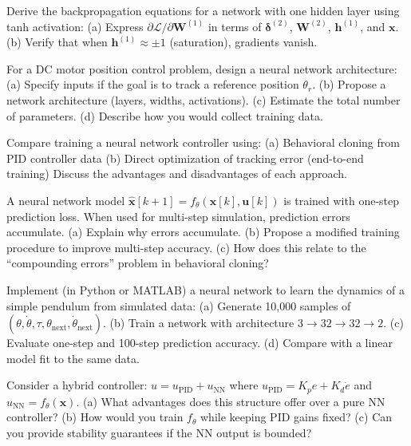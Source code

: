 \begin{exercise}
Derive the backpropagation equations for a network with one hidden layer using tanh activation:
(a) Express $\partial \mathcal{L}/\partial \mathbf{W}^{(1)}$ in terms of $\boldsymbol{\delta}^{(2)}$, $\mathbf{W}^{(2)}$, $\mathbf{h}^{(1)}$, and $\mathbf{x}$.
(b) Verify that when $\mathbf{h}^{(1)} \approx \pm 1$ (saturation), gradients vanish.
\end{exercise}

\begin{exercise}
For a DC motor position control problem, design a neural network architecture:
(a) Specify inputs if the goal is to track a reference position $\theta_r$.
(b) Propose a network architecture (layers, widths, activations).
(c) Estimate the total number of parameters.
(d) Describe how you would collect training data.
\end{exercise}

\begin{exercise}
Compare training a neural network controller using:
(a) Behavioral cloning from PID controller data
(b) Direct optimization of tracking error (end-to-end training)
Discuss the advantages and disadvantages of each approach.
\end{exercise}

\begin{exercise}
A neural network model $\hat{\mathbf{x}}[k+1] = f_\theta(\mathbf{x}[k], \mathbf{u}[k])$ is trained with one-step prediction loss. When used for multi-step simulation, prediction errors accumulate.
(a) Explain why errors accumulate.
(b) Propose a modified training procedure to improve multi-step accuracy.
(c) How does this relate to the ``compounding errors'' problem in behavioral cloning?
\end{exercise}

\begin{exercise}
Implement (in Python or MATLAB) a neural network to learn the dynamics of a simple pendulum from simulated data:
(a) Generate 10,000 samples of $(\theta, \dot{\theta}, \tau, \theta_{\text{next}}, \dot{\theta}_{\text{next}})$.
(b) Train a network with architecture $3 \to 32 \to 32 \to 2$.
(c) Evaluate one-step and 100-step prediction accuracy.
(d) Compare with a linear model fit to the same data.
\end{exercise}

\begin{exercise}
Consider a hybrid controller: $u = u_{\text{PID}} + u_{\text{NN}}$ where $u_{\text{PID}} = K_p e + K_d \dot{e}$ and $u_{\text{NN}} = f_\theta(\mathbf{x})$.
(a) What advantages does this structure offer over a pure NN controller?
(b) How would you train $f_\theta$ while keeping PID gains fixed?
(c) Can you provide stability guarantees if the NN output is bounded?
\end{exercise}

